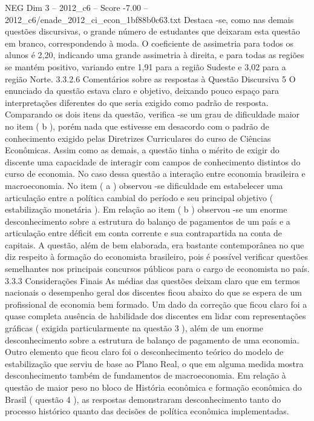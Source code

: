 \begin{textsample}{NEG Dim 3 – 2012\_c6 – Score -7.00 – 2012\_c6/enade\_2012\_ci\_econ\_1bf88b0c63.txt}
Destaca -se, como nas demais questões discursivas, o grande número de estudantes que deixaram esta questão em branco, correspondendo à moda.
O coeficiente de assimetria para todos os alunos é 2,20, indicando uma grande assimetria à direita, e para todas as regiões se mantém positivo, variando entre 1,91 para a região Sudeste e 3,02 para a região Norte. 3.3.2.6 Comentários sobre as respostas à Questão Discursiva 5 O enunciado da questão estava claro e objetivo, deixando pouco espaço para interpretações diferentes do que seria exigido como padrão de resposta.
Comparando os dois itens da questão, verifica -se um grau de dificuldade maior no item ( b ), porém nada que estivesse em desacordo com o padrão de conhecimento exigido pelas Diretrizes Curriculares do curso de Ciências Econômicas.
Assim como as demais, a questão tinha o mérito de exigir do discente uma capacidade de interagir com campos de conhecimento distintos do curso de economia.
No caso dessa questão a interação entre economia brasileira e macroeconomia.
No item ( a ) observou -se dificuldade em estabelecer uma articulação entre a política cambial do período e seu principal objetivo ( estabilização monetária ).
Em relação ao item ( b ) observou -se um enorme desconhecimento sobre a estrutura do balanço de pagamentos de um país e a articulação entre déficit em conta corrente e sua contrapartida na conta de capitais.
A questão, além de bem elaborada, era bastante contemporânea no que diz respeito à formação do economista brasileiro, pois é possível verificar questões semelhantes nos principais concursos públicos para o cargo de economista no país. 3.3.3 Considerações Finais As médias das questões deixam claro que em termos nacionais o desempenho geral dos discentes ficou abaixo do que se espera de um profissional de economia bem formado.
Um dado da correção que ficou claro foi a quase completa ausência de habilidade dos discentes em lidar com representações gráficas ( exigida particularmente na questão 3 ), além de um enorme desconhecimento sobre a estrutura de balanço de pagamento de uma economia.
Outro elemento que ficou claro foi o desconhecimento teórico do modelo de estabilização que serviu de base ao Plano Real, o que em alguma medida mostra desconhecimento também de fundamentos de macroeconomia.
Em relação à questão de maior peso no bloco de História econômica e formação econômica do Brasil ( questão 4 ), as respostas demonstraram desconhecimento tanto do processo histórico quanto das decisões de política econômica implementadas.

\end{textsample}
